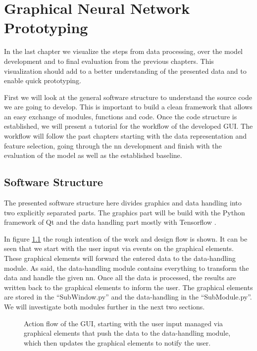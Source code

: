 \chapter{Graphical Neural Network Prototyping}
In the last chapter we visualize the steps from data processing, over the model development and to final evaluation from the previous chapters. This visualization should add to a better understanding of the presented data and to enable quick prototyping.

First we will look at the general software structure to understand the source code we are going to develop. This is important to build a clean framework that allows an easy exchange of modules, functions and code. \newline
Once the code structure is established, we will present a tutorial for the workflow of the developed GUI. The workflow will follow the past chapters starting with the data representation and feature selection, going through the \ac{nn} development and finish with the evaluation of the model as well as the established baseline.

	\section{Software Structure}
	The presented software structure here divides graphics and data handling into two explicitly separated parts. The graphics part will be build with the Python framework of Qt \cite{qt-web} and the data handling part mostly with Tensorflow \cite{tf-web}.
	
	In figure \ref{f:gui_source_flow} the rough intention of the work and design flow is shown. It can be seen that we start with the user input via events on the graphical elements. These graphical elements will forward the entered data to the data-handling module. As said, the data-handling module contains everything to transform the data and handle the given \ac{nn}. Once all the data is processed, the results are written back to the graphical elements to inform the user. \newline
	The graphical elements are stored in the \enquote{SubWindow.py} and the data-handling in the \enquote{SubModule.py}. We will investigate both modules further in the next two sections.
	
	\begin{figure}[htb]
	\centering
	
	\caption{Action flow of the GUI, starting with the user input managed via graphical elements that push the data to the data-handling module, which then updates the graphical elements to notify the user.}
	\label{f:gui_source_flow}
	\end{figure}	
	

